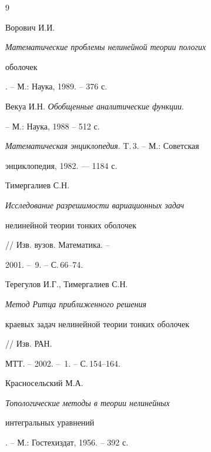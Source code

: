 \begin{thebibliography}{9} 


 




Ворович И.И. {\em Математические проблемы нелинейной теории пологих 


оболочек}. -- М.: Наука, 1989. -- 376 с. 




Векуа И.Н. {\em Обобщенные аналитические функции}. 


-- М.: Наука, 1988 -- 512 с. 




{\em Математическая энциклопедия}. T.\,3. -- М.: Советская 


энциклопедия, 1982. --- 1184 с. 




Тимергалиев С.Н. {\em Исследование разрешимости вариационных задач 


нелинейной теории тонких оболочек} // Изв. вузов. Математика. -- 


2001. -- \No\,9. -- С.\,66--74. 




Терегулов И.Г., Тимергалиев С.Н. {\em Метод Ритца приближенного решения 


краевых задач нелинейной теории тонких оболочек} // Изв. РАН. 


МТТ. -- 2002. -- \No\,1. -- С.\,154--164. 




Красносельский М.А. {\em Топологические методы в теории нелинейных 


интегральных уравнений}. -- М.: Гостехиздат, 1956. -- 392 с. 


 


\end{thebibliography} 


 


\vskip 0.5cm 


 






 


\label{end} 


 


